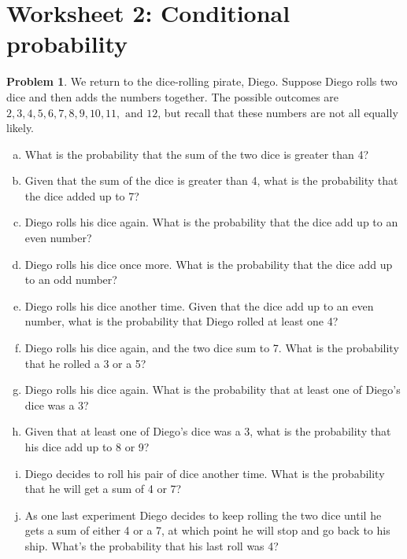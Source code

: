 \documentclass[10pt]{amsart}
\theoremstyle{definition}
\newtheorem{problem}{Problem} %
\begin{document}
\section*{Worksheet 2: Conditional probability}


\begin{problem}
  We return to the dice-rolling pirate, Diego. Suppose Diego rolls two dice and then adds the numbers
  together. The possible outcomes are $2,3,4,5,6,7,8,9,10,11, \text{ and }12$, but recall that these
  numbers are not all equally likely. 
  \begin{enumerate}[(a),itemsep=5em]
    \item What is the probability that the sum of the two dice is greater than 4? 
    \item Given that the sum of the dice is greater than 4, what is the
    probability that the dice added up to 7?
    \item Diego rolls his dice again. What is the probability that the dice add up to an even number?
    \item Diego rolls his dice once more. What is the probability that the dice add up to an odd
    number?
    \item Diego rolls his dice another time. Given that the dice add up to an even number, what is the
    probability that Diego rolled at least one 4?
    \item Diego rolls his dice again, and the two dice sum to 7. What is the probability that he rolled
    a 3 or a 5?
    \item Diego rolls his dice again. What is the probability that at least one of Diego's dice was a
    3?
    \item Given that at least one of Diego's dice was a 3, what is the probability that his dice add up
    to 8 or 9?
    \item Diego decides to roll his pair of dice another time. What is the probability that he will get
    a sum of 4 or 7?
    \item As one last experiment Diego decides to keep rolling the two dice until he gets a sum of
    either 4 or a 7, at which point he will stop and go back to his ship. What's the probability that
    his last roll was 4?
  \end{enumerate}
\end{problem}
\end{document}
